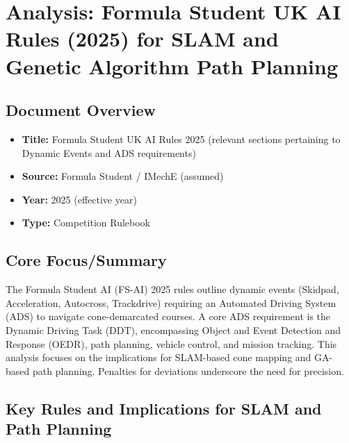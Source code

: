 \section{Analysis: Formula Student UK AI Rules (2025) for SLAM and Genetic Algorithm Path Planning}\label{sec:fs-uk-ai-rules-2025}

\subsection{Document Overview}\label{subsec:document-overview}
\begin{itemize}
    \item \textbf{Title:} Formula Student UK AI Rules 2025 (relevant sections pertaining to Dynamic Events and ADS requirements)
    \item \textbf{Source:} Formula Student / IMechE (assumed)
    \item \textbf{Year:} 2025 (effective year)
    \item \textbf{Type:} Competition Rulebook
\end{itemize}

\subsection{Core Focus/Summary}\label{subsec:core-focus/summary}
The Formula Student AI (FS-AI) 2025 rules outline dynamic events (Skidpad, Acceleration, Autocross, Trackdrive) requiring an Automated Driving System (ADS) to navigate cone-demarcated courses.
A core ADS requirement is the Dynamic Driving Task (DDT), encompassing Object and Event Detection and Response (OEDR), path planning, vehicle control, and mission tracking.
This analysis focuses on the implications for SLAM-based cone mapping and GA-based path planning.
Penalties for deviations underscore the need for precision.

\subsection{Key Rules and Implications for SLAM and Path Planning}\label{subsec:key-rules-and-implications-for-slam-and-path-planning}

